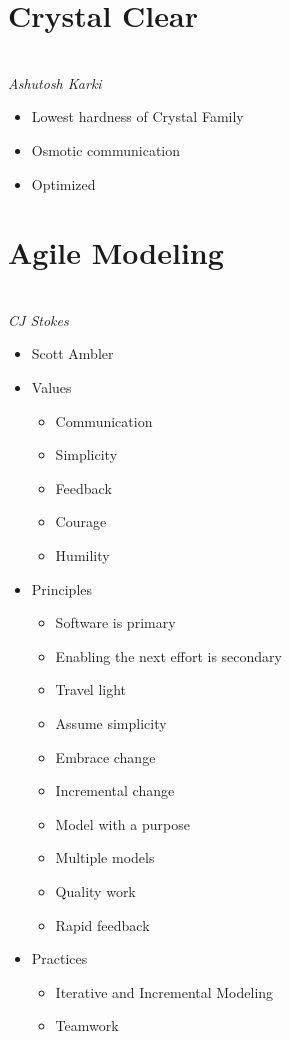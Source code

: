 \documentclass{report}
\begin{document}
		\section{Crystal Clear}\\
			\textit{Ashutosh Karki}
			\begin{itemize}
				\item Lowest hardness of Crystal Family
				\item Osmotic communication
				\item Optimized
			\end{itemize}
		\section{Agile Modeling}\\
			\textit{CJ Stokes}
			\begin{itemize}
				\item Scott Ambler
				\item Values
					\begin{itemize}
						\item Communication
						\item Simplicity
						\item Feedback
						\item Courage
						\item Humility
					\end{itemize}
				\item Principles
					\begin{itemize}
						\item Software is primary
						\item Enabling the next effort is secondary
						\item Travel light
						\item Assume simplicity
						\item Embrace change
						\item Incremental change
						\item Model with a purpose
						\item Multiple models
						\item Quality work
						\item Rapid feedback
					\end{itemize}
				\item Practices
					\begin{itemize}
						\item Iterative and Incremental Modeling
						\item Teamwork
					\end{itemize}
			\end{itemize}
\end{document}
